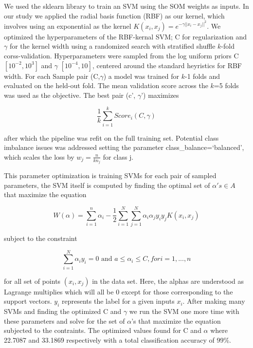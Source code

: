 \documentclass[12pt]{article}
\begin{document}
We used the sklearn library to train an SVM using the SOM weights as inputs. In our study we applied the radial basis function (RBF) as our kernel, which involves using an exponential as the kernel $K(x_i,x_j) = e^{-\gamma ||x_i-x_j||^2}$. We optimized the hyperparameters of the RBF-kernal SVM; C for regularization and $\gamma$ for the kernel width using a randomized search with stratified shuffle $k$-fold corss-validation. Hyperparameters were sampled from the log uniform priors C $[10^{-2}, 10^3]$ and $\gamma$ $[10^{-4}, 10]$, centered around the standard heyristics for RBF width. For each Sample pair (C,$\gamma$) a model was trained for $k$-1 folds and evaluated on the held-out fold. The mean validation score across the $k$=5 folds was used as the objective. The best pair (c', $\gamma$') maximizes 

$$\frac{1}{k} \sum_{i=1}^k Score_i(C,\gamma)$$

after which the pipeline was refit on the full training set. Potential class imbalance issues was addressed setting the parameter class\_balance=`balanced', which scales the loss by $w_j = \frac{n}{kn_j}$ for class j.

This parameter optimization is training SVMs for each pair of sampled parameters, the SVM itself is computed by finding the optimal set of $\alpha 's \in A$ that maximize the equation

$$W(\alpha) = \sum_{i=1}^n\alpha_i - \frac{1}{2} \sum_{i=1}^N \sum_{j=1}^N \alpha_i \alpha_j y_i y_j K(x_i, x_j)$$

subject to the constraint

$$\sum_{i=1}^N\alpha_iy_i = 0 \text{ and } a \leq \alpha_i \leq C, for i = 1, ...,n $$

for all set of points $(x_i,x_j)$ in the data set. Here, the alphas are understood as Lagrange multiplies which will all be 0 except for those corresponding to the support vectors. $y_i$ represents the label for a given inputs $x_i$. After making many SVMs and finding the optimized C and $\gamma$ we run the SVM one more time with these parameters and solve for the set of $\alpha$'s that maximize the equation subjected to the contraints. The optimized values found for C and $\alpha$ where 22.7087 and 33.1869 respectively with a total classification accuracy of 99\%.
\end{document}
